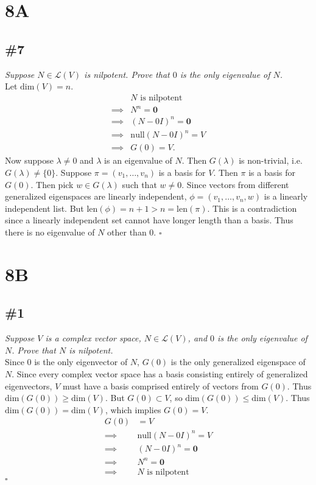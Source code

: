 \documentclass[12pt]{article}
\begin{document}
\section*{8A}
\subsection*{\#7}
{\it Suppose $N \in \mathcal{L}(V)$ is nilpotent.  Prove that $0$ is the only eigenvalue of $N$.} \\

\noindent Let $\text{dim}(V) = n$.
\begin{align*}
	&N \text{ is nilpotent} \\
	\implies &N^n = \mathbf{0} \\
	\implies &(N - 0I)^n = \mathbf{0} \\
	\implies &\text{null}(N - 0I)^n = V \\
	\implies &G(0) = V.
\end{align*}
Now suppose $\lambda \neq 0$ and $\lambda$ is an eigenvalue of $N$.  Then $G(\lambda)$ is non-trivial, i.e. $G(\lambda) \neq \{0\}$.  Suppose $\pi = (v_1, \dots, v_n)$ is a basis for $V$.  Then $\pi$ is a basis for $G(0)$.  Then pick $w \in G(\lambda)$ such that $w \neq 0$.  Since vectors from different generalized eigenspaces are linearly independent, $\phi = (v_1, \dots, v_n, w)$ is a linearly independent list.  But $\text{len}(\phi) = n+1 > n = \text{len}(\pi)$.  This is a contradiction since a linearly independent set cannot have longer length than a basis.  Thus there is no eigenvalue of $N$ other than $0$. \hfill $\square$

\section*{8B}
\subsection*{\#1}
{\it Suppose $V$ is a complex vector space, $N \in \mathcal{L}(V)$, and $0$ is the only eigenvalue of $N$.  Prove that $N$ is nilpotent.} \\

\noindent Since $0$ is the only eigenvector of $N$, $G(0)$ is the only generalized eigenspace of $N$.  Since every complex vector space has a basis consisting entirely of generalized eigenvectors, $V$ must have a basis comprised entirely of vectors from $G(0)$.  Thus $\text{dim}(G(0)) \geq \text{dim}(V)$.  But $G(0) \subset V$, so $\text{dim}(G(0)) \leq \text{dim}(V)$.  Thus $\text{dim}(G(0)) = \text{dim}(V)$, which implies $G(0) = V$.
\begin{align*}
	G(0) &= V \\
	\implies &\text{null}(N - 0I)^n = V \\
	\implies &(N - 0I)^n = \mathbf{0} \\
	\implies &N^n = \mathbf{0} \\
	\implies &N \text{ is nilpotent}
\end{align*}
\hfill $\square$
\end{document}
